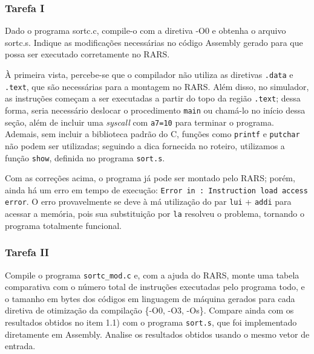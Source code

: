 \documentclass[a4paper,12pt]{article}
\newcommand{\cod}[1]{\texttt{#1}}
\begin{document}
\subsubsection{Tarefa I}
\begin{tcolorbox}[title=Enunciado, colback=blue!5!white, colframe=blue!75!black]
Dado o programa sortc.c, compile-o com a diretiva -O0 e obtenha o arquivo sortc.s. Indique as modificações necessárias no código Assembly gerado para que possa ser executado corretamente no RARS.
\end{tcolorbox}

À primeira vista, percebe-se que o compilador não utiliza as diretivas \cod{.data} e \cod{.text}, que são necessárias para a montagem no RARS. Além disso, no simulador, as instruções começam a ser executadas a partir do topo da região \cod{.text}; dessa forma, seria necessário deslocar o procedimento \cod{main} ou chamá-lo no início dessa seção, além de incluir uma \textit{syscall} com \cod{a7=10} para terminar o programa. Ademais, sem incluir a biblioteca padrão do C, funções como \cod{printf} e \cod{putchar} não podem ser utilizadas; seguindo a dica fornecida no roteiro, utilizamos a função \cod{show}, definida no programa \cod{sort.s}.

Com as correções acima, o programa já pode ser montado pelo RARS; porém, ainda há um erro em tempo de execução: \cod{Error in : Instruction load access error}. O erro provavelmente se deve à má utilização do par \cod{lui} + \cod{addi} para acessar a memória, pois sua substituição por \cod{la} resolveu o problema, tornando o programa totalmente funcional.

\subsubsection{Tarefa II}
\begin{tcolorbox}[title=Enunciado, colback=blue!5!white, colframe=blue!75!black]
Compile o programa \cod{sortc\_mod.c} e, com a ajuda do RARS, monte uma tabela comparativa com o número total de instruções executadas pelo programa todo, e o tamanho em bytes dos códigos em linguagem de máquina gerados para cada diretiva de otimização da compilação \{-O0, -O3, -Os\}. Compare ainda com os resultados obtidos no item 1.1) com o programa \cod{sort.s}, que foi implementado diretamente em Assembly. Analise os resultados obtidos usando o mesmo vetor de entrada.  
\end{tcolorbox}
\end{document}
